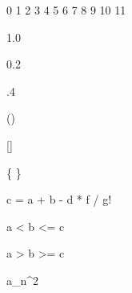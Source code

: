   0 1 2 3 4 5 6 7 8 9 10 11

  1.0

  0.2

  .4

  ()

  []

  \{ \}

  c = a + b - d * f / g!

  a < b <= c

  a > b >= c

  a_n^2

$$